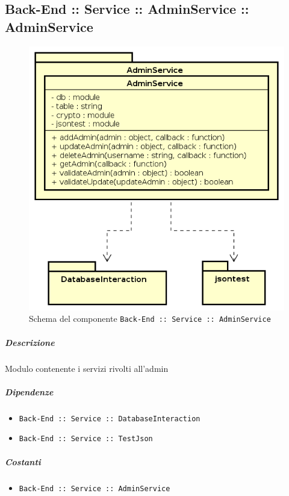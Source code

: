 \documentclass[../ManualeSviluppatore_v2.0.0.tex]{subfiles}
\begin{document}
\subsection{Back-End :: Service :: AdminService :: AdminService}
\begin{figure}[!h]
	\centering
	\includegraphics[scale=0.6]{Architettura/Back-End/Service/AdminService.png}
	\caption{Schema del componente \texttt{Back-End :: Service :: AdminService}}
\end{figure}
\subparagraph{Descrizione} Modulo contenente i servizi rivolti all'admin
\subparagraph{Dipendenze}
\begin{itemize}
	\item \texttt{Back-End :: Service :: DatabaseInteraction}
	\item \texttt{Back-End :: Service :: TestJson}
\end{itemize}
\subparagraph{Costanti}
\begin{itemize}
	\item \texttt{Back-End :: Service :: AdminService}
\end{itemize}
\end{document}
